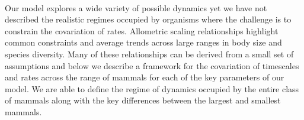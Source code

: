 \documentclass{pnastwo}
\begin{document}
\begin{article}
%




\vspace{2mm}
 \\ \nonumber
Our model explores a wide variety of possible dynamics yet we have not described the realistic regimes occupied by organisms where the challenge is to constrain the covariation of rates. Allometric scaling relationships highlight common constraints and average trends across large ranges in body size and species diversity. Many of these relationships can be derived from a small set of assumptions and below we describe a framework for the covariation of timescales and rates across the range of mammals for each of the key parameters of our model. We are able to define the regime of dynamics occupied by the entire class of mammals along with the key differences between the largest and smallest mammals.




\end{article}
\end{document}

